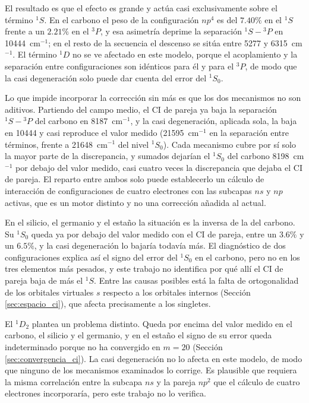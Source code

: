 El resultado es que el efecto es grande y actúa casi exclusivamente sobre el término $^1S$. En el carbono el peso de la configuración $np^4$ es del $7.40\%$ en el $^1S$ frente a un $2.21\%$ en el $^3P$, y esa asimetría deprime la separación $^1S - {}^3P$ en \num{10444}~cm$^{-1}$; en el resto de la secuencia el descenso se sitúa entre \num{5277} y \num{6315}~cm$^{-1}$. El término $^1D$ no se ve afectado en este modelo, porque el acoplamiento y la separación entre configuraciones son idénticos para él y para el $^3P$, de modo que la casi degeneración solo puede dar cuenta del error del $^1S_0$.

Lo que impide incorporar la corrección sin más es que los dos mecanismos no son aditivos. Partiendo del campo medio, el CI de pareja ya baja la separación $^1S - {}^3P$ del carbono en \num{8187}~cm$^{-1}$, y la casi degeneración, aplicada sola, la baja en \num{10444} y casi reproduce el valor medido (\num{21595}~cm$^{-1}$ en la separación entre términos, frente a \num{21648}~cm$^{-1}$ del nivel $^1S_0$). Cada mecanismo cubre por sí solo la mayor parte de la discrepancia, y sumados dejarían el $^1S_0$ del carbono \num{8198}~cm$^{-1}$ por debajo del valor medido, casi cuatro veces la discrepancia que dejaba el CI de pareja. El reparto entre ambos solo puede establecerlo un cálculo de interacción de configuraciones de cuatro electrones con las subcapas $ns$ y $np$ activas, que es un motor distinto y no una corrección añadida al actual.

En el silicio, el germanio y el estaño la situación es la inversa de la del carbono. Su $^1S_0$ queda ya por debajo del valor medido con el CI de pareja, entre un $3.6\%$ y un $6.5\%$, y la casi degeneración lo bajaría todavía más. El diagnóstico de dos configuraciones explica así el signo del error del $^1S_0$ en el carbono, pero no en los tres elementos más pesados, y este trabajo no identifica por qué allí el CI de pareja baja de más el $^1S$. Entre las causas posibles está la falta de ortogonalidad de los orbitales virtuales $s$ respecto a los orbitales internos (Sección \ref{sec:espacio_ci}), que afecta precisamente a los singletes.

El $^1D_2$ plantea un problema distinto. Queda por encima del valor medido en el carbono, el silicio y el germanio, y en el estaño el signo de su error queda indeterminado porque no ha convergido en $m=20$ (Sección \ref{sec:convergencia_ci}). La casi degeneración no lo afecta en este modelo, de modo que ninguno de los mecanismos examinados lo corrige. Es plausible que requiera la misma correlación entre la subcapa $ns$ y la pareja $np^2$ que el cálculo de cuatro electrones incorporaría, pero este trabajo no lo verifica.

